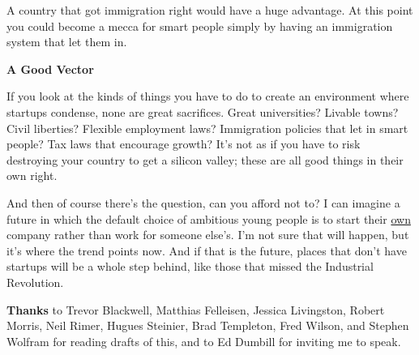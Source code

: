 A country that got immigration right would have a huge advantage. At
this point you could become a mecca for smart people simply by having an
immigration system that let them in.

\textbf{A Good Vector}

If you look at the kinds of things you have to do to create an
environment where startups condense, none are great sacrifices. Great
universities? Livable towns? Civil liberties? Flexible employment laws?
Immigration policies that let in smart people? Tax laws that encourage
growth? It's not as if you have to risk destroying your country to get a
silicon valley; these are all good things in their own right.

And then of course there's the question, can you afford not to? I can
imagine a future in which the default choice of ambitious young people
is to start their \href{hiring.html}{own} company rather than work for
someone else's. I'm not sure that will happen, but it's where the trend
points now. And if that is the future, places that don't have startups
will be a whole step behind, like those that missed the Industrial
Revolution.


\textbf{Thanks} to Trevor Blackwell, Matthias Felleisen, Jessica
Livingston, Robert Morris, Neil Rimer, Hugues Steinier, Brad Templeton,
Fred Wilson, and Stephen Wolfram for reading drafts of this, and to Ed
Dumbill for inviting me to speak.